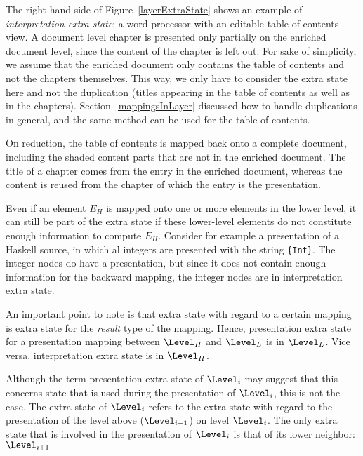 
The right-hand side of Figure~\ref{layerExtraState} shows an example of {\em interpretation extra state}: a word processor with an editable table of contents view. A document level chapter is presented only partially on the enriched document level, since the content of the chapter is left out. For sake of simplicity, we assume that the enriched document only contains the table of contents and not the chapters themselves. This way, we only have to consider the extra state here and not the duplication (titles appearing in the table of contents as well as in the chapters). Section~\ref{mappingsInLayer} discussed how to handle duplications in general, and the same method can be used for the table of contents.

On reduction, the table of contents is mapped back onto a complete document, including the shaded content parts that are not in the enriched document. The title of a chapter comes from the entry in the enriched document, whereas the content is reused from the chapter of which the entry is the presentation. 



Even if an element $E_H$ is mapped onto one or more elements in the lower level, it can still be part of the extra state if these lower-level elements do not constitute enough information to compute $E_H$. Consider for example a presentation of a Haskell source, in which al integers are presented with the string \verb|{Int}|. The integer nodes do have a presentation, but since it does not contain enough information for the backward mapping, the integer nodes are in interpretation extra state.  

An important point to note is that extra state with regard to a certain mapping is extra state for the {\em result} type of the mapping. Hence, presentation extra state for a presentation mapping between $\Level_{H}$ and $\Level_{L}$ is in $\Level_{L}$. Vice versa, interpretation extra state is in $\Level_{H}$.

\bc Although the term presentation extra state of $\Level_i$ may suggest that this concerns state that is used during the presentation of $\Level_i$, this is not the case. The extra state of $\Level_i$ refers to the extra state with regard to the presentation of the level above ($\Level_{i-1}$) on level $\Level_i$. The only extra state that is involved in the presentation of $\Level_i$ is that of its lower neighbor: $\Level_{i+1}$
\ec


